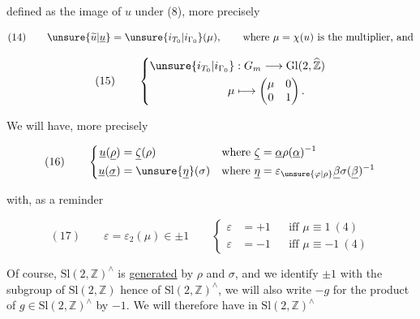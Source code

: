 

defined  as the image of $u$ under (8), more
precisely

\[
(14)\qquad
\unsure{\widetilde{u}|\underline{u}}=
\unsure{i_{T_0}|i_{\Gamma_0}}(\mu),\qquad
\text{where }\mu=\chi(u)\text{ is the multiplier, and}
\]

\[
(15)\qquad
\left\{\begin{aligned}
\unsure{i_{T_0}|i_{\Gamma_0}} &:G_m\longrightarrow
\mathrm{Gl}(2,\widehat{\mathbb Z})\\
\mu&\longmapsto\begin{pmatrix}\mu&0\\0&1\end{pmatrix}.
\end{aligned}\right.
\]

We will have, more precisely

\[
(16)\qquad
\left\{\begin{aligned}
\underline{u}(\underline{\rho})&=\underline{\zeta}(\rho)
&\text{where }\underline{\zeta}&=\underline{\alpha}\rho(\underline{\alpha})^{-1}\\
\underline{u}(\underline{\sigma})&=\unsure{\underline{\eta}}(\sigma)
&\text{where }\underline{\eta}&=\varepsilon_{\unsure{\varphi|\rho}}
\underline{\beta}\sigma(\underline{\beta})^{-1}
\end{aligned}\right.
\]



with, as a reminder

\[
(17)\qquad
\varepsilon=\varepsilon_2(\mu)\in\pm1
\qquad
\left\{\begin{aligned}
\varepsilon&=+1&&\text{iff }\mu\equiv1\ (4)\\
\varepsilon&=-1&&\text{iff }\mu\equiv-1\ (4)
\end{aligned}\right.
\]

Of course, $\mathrm{Sl}(2,\mathbb Z)^\wedge$ is
\uline{generated}  by $\rho$ and $\sigma$,
and we identify $\pm1$ with the  subgroup
of $\mathrm{Sl}(2,\mathbb Z)$ hence of
$\mathrm{Sl}(2,\mathbb Z)^\wedge$, we will also write
$-g$ for the product of $g\in\mathrm{Sl}(2,\mathbb Z)^\wedge$
by $-1$. We will therefore have in $\mathrm{Sl}(2,\mathbb Z)^\wedge$

